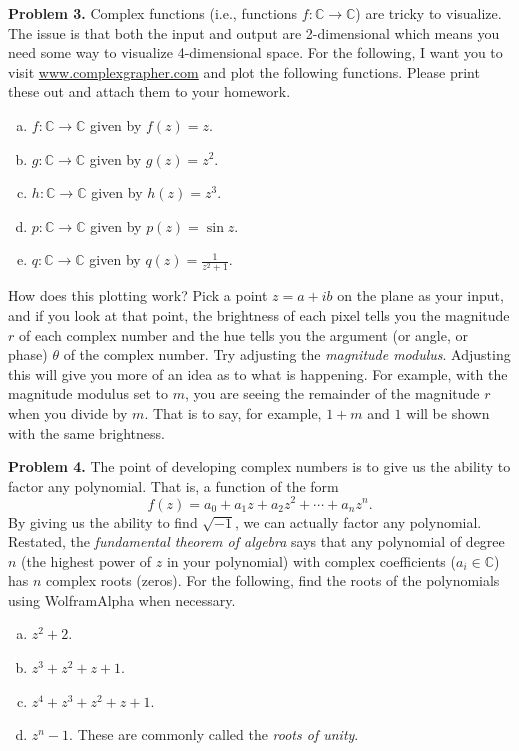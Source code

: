 \documentclass[12pt]{report} %
\newcommand{\C}{\mathbb{C}}
\theoremstyle{definition}
\begin{document}
\noindent\textbf{Problem 3.} Complex functions (i.e., functions $f\colon \C \to \C$) are tricky to visualize.  The issue is that both the input and output are 2-dimensional which means you need some way to visualize 4-dimensional space.  For the following, I want you to visit \url{www.complexgrapher.com} and plot the following functions. Please print these out and attach them to your homework. 
\begin{enumerate}[(a)]
    \item $f\colon \C \to \C$ given by $f(z)=z$.
    \item $g\colon \C \to \C$ given by $g(z)=z^2$.
    \item $h\colon \C \to \C$ given by $h(z)=z^3$.
    \item $p\colon \C \to \C$ given by $p(z)=\sin z$.
    \item $q\colon \C \to \C$ given by $q(z)=\frac{1}{z^2+1}$.
\end{enumerate}
How does this plotting work?  Pick a point $z=a+ib$ on the plane as your input, and if you look at that point, the brightness of each pixel tells you the magnitude $r$ of each complex number and the hue tells you the argument (or angle, or phase) $\theta$ of the complex number. Try adjusting the \emph{magnitude modulus}.  Adjusting this will give you more of an idea as to what is happening.  For example, with the magnitude modulus set to $m$, you are seeing the remainder of the magnitude $r$ when you divide by $m$.  That is to say, for example, $1+m$ and $1$ will be shown with the same brightness.
\vspace{.5cm}

\noindent\textbf{Problem 4.} The point of developing complex numbers is to give us the ability to factor any polynomial.  That is, a function of the form
\[
f(z)=a_0 + a_1 z + a_2 z^2 + \cdots + a_n z^n.
\]
By giving us the ability to find $\sqrt{-1}$, we can actually factor any polynomial.  Restated, the \emph{fundamental theorem of algebra} says that any polynomial of degree $n$ (the highest power of $z$ in your polynomial) with complex coefficients ($a_i \in \C$) has $n$ complex roots (zeros).  
For the following, find the roots of the polynomials using WolframAlpha when necessary.
\begin{enumerate}[(a)]
    \item $z^2+2$.
    \item $z^3+z^2+z+1$.
    \item $z^4+z^3+z^2+z+1$.
    \item $z^n-1$. These are commonly called the \emph{roots of unity}.
\end{enumerate}
\vspace{.5cm}
\end{document}
